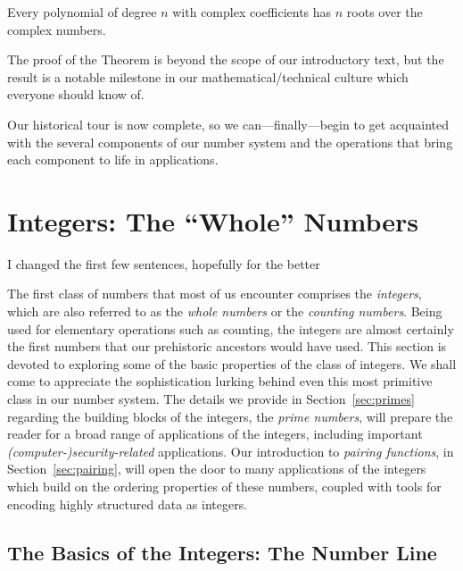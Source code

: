 
\begin{theorem}
Every polynomial of degree $n$ with complex coefficients has $n$ roots over the complex numbers.
\end{theorem}

The proof of the Theorem is beyond the scope of our introductory text, but the result is a notable milestone in our mathematical/technical culture which everyone should know of.

\bigskip

Our historical tour is now complete, so we can---finally---begin to get acquainted with the several components of our number system and the operations that bring each component to life in applications.

\section{Integers: The ``Whole'' Numbers}
\label{sec:integers}

 

{\Arny I changed the first few sentences, hopefully for the better}

The first class of numbers that most of us encounter comprises the {\it integers}, which are also referred to as the {\it whole numbers} or the {\em counting numbers}.  Being used for elementary operations such as counting, the integers are almost certainly the first numbers that our prehistoric ancestors would have used.  This section is devoted to exploring some of the basic properties of the class of integers.  We shall come to appreciate the sophistication lurking behind even this most primitive class in our number system.  The details we provide in Section~\ref{sec:primes} regarding the building blocks of the integers, the {\it prime numbers}, will prepare the reader for a broad range of applications of the integers, including important {\em (computer-)security-related} applications.  Our introduction to {\it pairing functions}, in Section~\ref{sec:pairing}, will open the door to many applications of the integers which build on the ordering properties of these numbers, coupled with tools for encoding highly structured data as integers.

\subsection{The Basics of the Integers: The Number Line}
\label{sec:integer-number-line}

